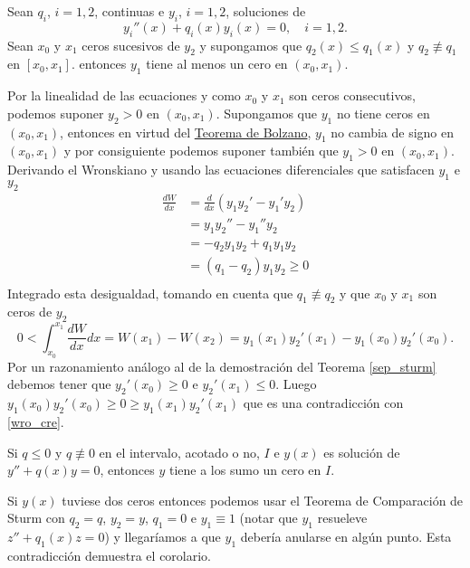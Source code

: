 \begin{teorema} Sean $q_i$, $i=1,2$,  continuas e  $y_i$, $i=1,2$, soluciones de
\[ y_i''(x)+q_i(x)y_i(x)=0,\quad i=1,2.\]
Sean $x_0$ y $x_1$ ceros sucesivos de $y_2$ y supongamos que $q_2(x)\leq q_1(x)$ y $q_2\not\equiv q_1$ en $[x_0,x_1]$. entonces $y_1$ tiene al menos un cero en $(x_0,x_1)$. 
\end{teorema}
\begin{demo} Por la linealidad de las ecuaciones y como $x_0$ y $x_1$ son ceros consecutivos, podemos suponer $y_2>0$ en $(x_0,x_1)$. Supongamos que $y_1$ no tiene ceros en $(x_0,x_1)$, entonces en virtud del \href{http://es.wikipedia.org/wiki/Teorema_del_valor_intermedio}{Teorema de Bolzano}, $y_1$ no cambia de signo en $(x_0,x_1)$ y por consiguiente podemos suponer también que $y_1>0$ en $(x_0,x_1)$. Derivando el Wronskiano y usando las ecuaciones diferenciales que satisfacen $y_1$ e $y_2$ 
\[\begin{split}
\frac{dW}{dx} &= \frac{d}{dx} (y_1y_2'-y_1'y_2)\\
&=y_1y_2''-y_1''y_2\\
&=-q_2y_1y_2+q_1y_1y_2\\
&=(q_1-q_2)y_1y_2\geq 0\\
\end{split}
\]
Integrado esta desigualdad, tomando en cuenta que $q_1\not\equiv q_2$ y que $x_0$ y $x_1$ son ceros de $y_2$
\begin{equation}\label{wro_cre}0<\int_{x_0}^{x_1}\frac{dW}{dx}dx=W(x_1)-W(x_2)=y_1(x_1)y_2'(x_1)-y_1(x_0)y_2'(x_0).
\end{equation}
Por un razonamiento análogo al de la demostración del Teorema \ref{sep_sturm} debemos tener que $y_2'(x_0)\geq 0$ e $y_2'(x_1)\leq 0$. Luego $y_1(x_0)y_2'(x_0)\geq 0\geq y_1(x_1)y_2'(x_1)$ que es una contradicción con \eqref{wro_cre}.\end{demo}


\begin{corolario} Si $q\leq 0$ y $q\not\equiv 0$ en el intervalo, acotado o no, $I$ e  $y(x)$ es solución de $y''+q(x)y=0$, entonces $y$ tiene a los sumo un cero en $I$.
\end{corolario}
\begin{demo} Si $y(x)$ tuviese dos ceros entonces podemos usar el Teorema de Comparación de Sturm con $q_2=q$, $y_2=y$, $q_1=0$ e $y_1\equiv 1$ (notar que $y_1$ resueleve $z''+q_1(x)z=0$) y llegaríamos a que $y_1$ debería anularse en algún punto. Esta contradicción demuestra el corolario.  
\end{demo}



